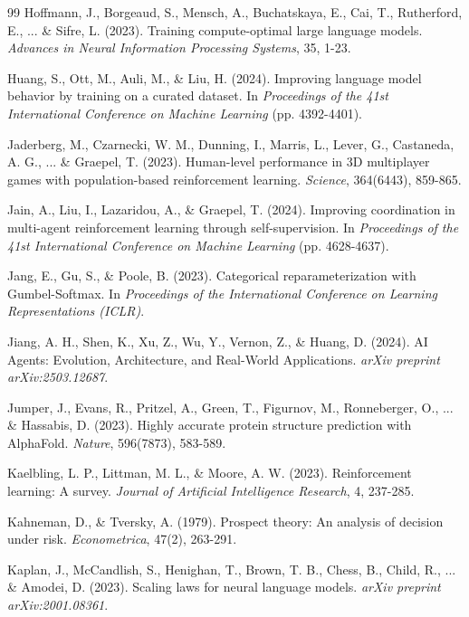 \begin{thebibliography}{99}
Hoffmann, J., Borgeaud, S., Mensch, A., Buchatskaya, E., Cai, T., Rutherford, E., ... \& Sifre, L. (2023). Training compute-optimal large language models. \textit{Advances in Neural Information Processing Systems}, 35, 1-23.

Huang, S., Ott, M., Auli, M., \& Liu, H. (2024). Improving language model behavior by training on a curated dataset. In \textit{Proceedings of the 41st International Conference on Machine Learning} (pp. 4392-4401).

Jaderberg, M., Czarnecki, W. M., Dunning, I., Marris, L., Lever, G., Castaneda, A. G., ... \& Graepel, T. (2023). Human-level performance in 3D multiplayer games with population-based reinforcement learning. \textit{Science}, 364(6443), 859-865.

Jain, A., Liu, I., Lazaridou, A., \& Graepel, T. (2024). Improving coordination in multi-agent reinforcement learning through self-supervision. In \textit{Proceedings of the 41st International Conference on Machine Learning} (pp. 4628-4637).

Jang, E., Gu, S., \& Poole, B. (2023). Categorical reparameterization with Gumbel-Softmax. In \textit{Proceedings of the International Conference on Learning Representations (ICLR)}.

Jiang, A. H., Shen, K., Xu, Z., Wu, Y., Vernon, Z., \& Huang, D. (2024). AI Agents: Evolution, Architecture, and Real-World Applications. \textit{arXiv preprint arXiv:2503.12687}.

Jumper, J., Evans, R., Pritzel, A., Green, T., Figurnov, M., Ronneberger, O., ... \& Hassabis, D. (2023). Highly accurate protein structure prediction with AlphaFold. \textit{Nature}, 596(7873), 583-589.

Kaelbling, L. P., Littman, M. L., \& Moore, A. W. (2023). Reinforcement learning: A survey. \textit{Journal of Artificial Intelligence Research}, 4, 237-285.

Kahneman, D., \& Tversky, A. (1979). Prospect theory: An analysis of decision under risk. \textit{Econometrica}, 47(2), 263-291.

Kaplan, J., McCandlish, S., Henighan, T., Brown, T. B., Chess, B., Child, R., ... \& Amodei, D. (2023). Scaling laws for neural language models. \textit{arXiv preprint arXiv:2001.08361}.


\end{thebibliography}

